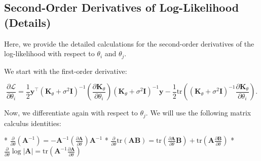 

\subsection{Second-Order Derivatives of Log-Likelihood (Details)}

Here, we provide the detailed calculations for the second-order derivatives of the log-likelihood with respect to $\theta_i$ and $\theta_j$.

We start with the first-order derivative:

$$
\frac{\partial \mathcal{L}}{\partial \theta_i} = \frac{1}{2} \mathbf{y}^\top (\mathbf{K}_\theta + \sigma^2 \mathbf{I})^{-1} \left(\frac{\partial \mathbf{K}_\theta}{\partial \theta_i}\right) (\mathbf{K}_\theta + \sigma^2 \mathbf{I})^{-1} \mathbf{y} - \frac{1}{2} \text{tr}\left((\mathbf{K}_\theta + \sigma^2 \mathbf{I})^{-1} \frac{\partial \mathbf{K}_\theta}{\partial \theta_i}\right).
$$

Now, we differentiate again with respect to $\theta_j$. We will use the following matrix calculus identities:

*   $\frac{\partial}{\partial \theta} (\mathbf{A}^{-1}) = -\mathbf{A}^{-1} (\frac{\partial \mathbf{A}}{\partial \theta}) \mathbf{A}^{-1}$
*   $\frac{\partial}{\partial \theta} \text{tr}(\mathbf{A}\mathbf{B}) = \text{tr}(\frac{\partial \mathbf{A}}{\partial \theta} \mathbf{B}) + \text{tr}(\mathbf{A} \frac{\partial \mathbf{B}}{\partial \theta})$
*   $\frac{\partial}{\partial \theta} \log|\mathbf{A}| = \text{tr}(\mathbf{A}^{-1} \frac{\partial \mathbf{A}}{\partial \theta})$

